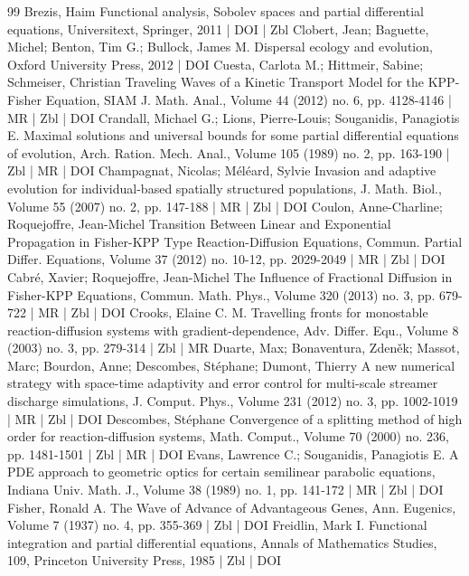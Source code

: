 \documentclass[10pt]{amsart}
\theoremstyle{definition}\newtheorem{defi}[theo]{Definition}\newtheorem{rema}[theo]{Remark}\newtheorem{exam}[theo]{Example}\newtheorem{exem}[theo]{Example}\newtheorem{nota}[theo]{Notation}
\newcommand{\1}{\mathds{1}}
\begin{document}
\begin{thebibliography}{99}
Brezis, Haim Functional analysis, Sobolev spaces and partial differential equations, Universitext, Springer, 2011 | DOI | Zbl
Clobert, Jean; Baguette, Michel; Benton, Tim G.; Bullock, James M. Dispersal ecology and evolution, Oxford University Press, 2012 | DOI
Cuesta, Carlota M.; Hittmeir, Sabine; Schmeiser, Christian Traveling Waves of a Kinetic Transport Model for the KPP-Fisher Equation, SIAM J. Math. Anal., Volume 44 (2012) no. 6, pp. 4128-4146 | MR | Zbl | DOI
Crandall, Michael G.; Lions, Pierre-Louis; Souganidis, Panagiotis E. Maximal solutions and universal bounds for some partial differential equations of evolution, Arch. Ration. Mech. Anal., Volume 105 (1989) no. 2, pp. 163-190 | Zbl | MR | DOI
Champagnat, Nicolas; Méléard, Sylvie Invasion and adaptive evolution for individual-based spatially structured populations, J. Math. Biol., Volume 55 (2007) no. 2, pp. 147-188 | MR | Zbl | DOI
Coulon, Anne-Charline; Roquejoffre, Jean-Michel Transition Between Linear and Exponential Propagation in Fisher-KPP Type Reaction-Diffusion Equations, Commun. Partial Differ. Equations, Volume 37 (2012) no. 10-12, pp. 2029-2049 | MR | Zbl | DOI
Cabré, Xavier; Roquejoffre, Jean-Michel The Influence of Fractional Diffusion in Fisher-KPP Equations, Commun. Math. Phys., Volume 320 (2013) no. 3, pp. 679-722 | MR | Zbl | DOI
Crooks, Elaine C. M. Travelling fronts for monostable reaction-diffusion systems with gradient-dependence, Adv. Differ. Equ., Volume 8 (2003) no. 3, pp. 279-314 | Zbl | MR
Duarte, Max; Bonaventura, Zdeněk; Massot, Marc; Bourdon, Anne; Descombes, Stéphane; Dumont, Thierry A new numerical strategy with space-time adaptivity and error control for multi-scale streamer discharge simulations, J. Comput. Phys., Volume 231 (2012) no. 3, pp. 1002-1019 | MR | Zbl | DOI
Descombes, Stéphane Convergence of a splitting method of high order for reaction-diffusion systems, Math. Comput., Volume 70 (2000) no. 236, pp. 1481-1501 | Zbl | MR | DOI
Evans, Lawrence C.; Souganidis, Panagiotis E. A PDE approach to geometric optics for certain semilinear parabolic equations, Indiana Univ. Math. J., Volume 38 (1989) no. 1, pp. 141-172 | MR | Zbl | DOI
Fisher, Ronald A. The Wave of Advance of Advantageous Genes, Ann. Eugenics, Volume 7 (1937) no. 4, pp. 355-369 | Zbl | DOI
Freidlin, Mark I. Functional integration and partial differential equations, Annals of Mathematics Studies, 109, Princeton University Press, 1985 | Zbl | DOI

\end{thebibliography}
\end{document}
